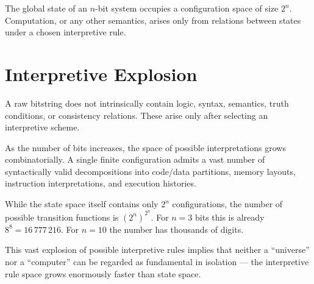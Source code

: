 The global state of an $n$-bit system occupies a configuration space of size $2^n$.
Computation, or any other semantics, arises only from relations between states under a chosen interpretive rule.


\section{Interpretive Explosion}

A raw bitstring does not intrinsically contain logic, syntax, semantics, truth conditions, or consistency relations.
These arise only after selecting an interpretive scheme.

As the number of bits increases, the space of possible interpretations grows combinatorially.
A single finite configuration admits a vast number of syntactically valid decompositions into code/data partitions,
memory layouts, instruction interpretations, and execution histories.

While the state space itself contains only $2^n$ configurations, the number of possible transition functions is $(2^n)^{2^n}$.
For $n=3$ bits this is already $8^8 = 16\,777\,216$.
For $n=10$ the number has thousands of digits.

This vast explosion of possible interpretive rules implies that neither a ``universe'' nor a ``computer'' can be regarded as fundamental in isolation —
the interpretive rule space grows enormously faster than state space.


